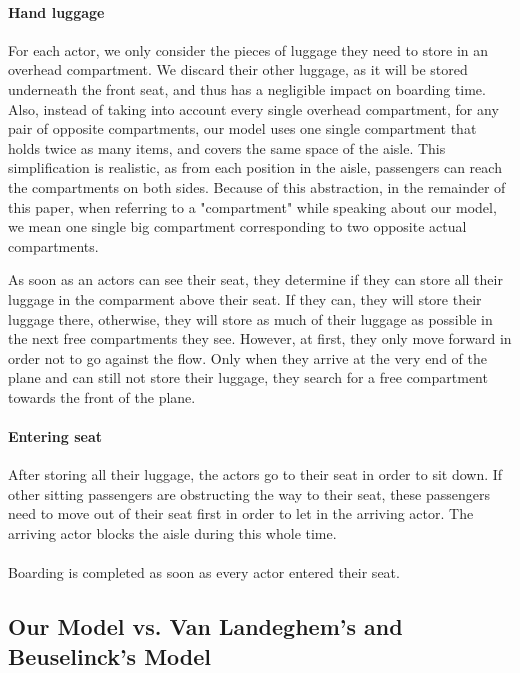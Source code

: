 \documentclass[11pt]{article}
\begin{document}
\paragraph{Hand luggage}
For each actor, we only consider the pieces of luggage they need to store in an overhead compartment. We discard their other luggage, as it will be stored underneath the front seat, and thus has a negligible impact on boarding time. Also, instead of taking into account every single overhead compartment, for any pair of opposite compartments, our model uses one single compartment that holds twice as many items, and covers the same space of the aisle. This simplification is realistic, as from each position in the aisle, passengers can reach the compartments on both sides. Because of this abstraction, in the remainder of this paper, when referring to a "compartment" while speaking about our model, we mean one single big compartment corresponding to two opposite actual compartments.

	As soon as an actors can see their seat, they determine if they can store all their luggage in the comparment above their seat. If they can, they will store their luggage there, otherwise, they will store as much of their luggage as possible in the next free compartments they see. However, at first, they only move forward in order not to go against the flow. Only when they arrive at the very end of the plane and can still not store their luggage, they search for a free compartment towards the front of the plane.


\paragraph{Entering seat}
After storing all their luggage, the actors go to their seat in order to sit down. If other sitting passengers are obstructing the way to their seat, these passengers need to move out of their seat first in order to let in the arriving actor. The arriving actor blocks the aisle during this whole time.
\\\\
Boarding is completed as soon as every actor entered their seat.


\subsection{Our Model vs. Van Landeghem's and Beuselinck's Model} 
\end{document}
